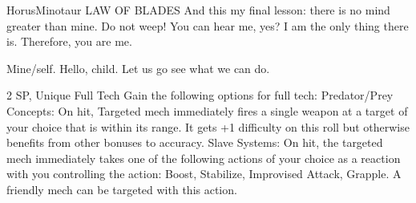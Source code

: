 \begin{mech}{Horus}{Minotaur}
LAW OF BLADES
And this my final lesson: there is no mind greater than mine. 
Do not weep! You can hear me, yes? I am the only thing there is. Therefore, you are me. 

Mine/self. Hello, child. Let us go see what we can do. 

2 SP, Unique
Full Tech
Gain the following options for full tech:
Predator/Prey Concepts: On hit, Targeted mech immediately fires a single weapon at a target of your choice that is within its range. It gets +1 difficulty on this roll but otherwise benefits from other bonuses to accuracy.
Slave Systems: On hit, the targeted mech immediately takes one of the following actions of your choice as a reaction with you controlling the action: Boost, Stabilize, Improvised Attack, Grapple. A friendly mech can be targeted with this action.


\end{mech}
